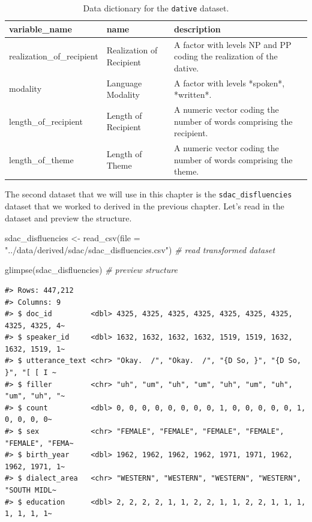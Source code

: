 \documentclass[
  letterpaper,
]{latex/krantz}
\newenvironment{Shaded}{\begin{snugshade}}{\end{snugshade}}
\newcommand{\AttributeTok}[1]{\textcolor[rgb]{0.00,0.00,0.00}{#1}}
\newcommand{\CommentTok}[1]{\textcolor[rgb]{0.00,0.00,0.00}{\textit{#1}}}
\newcommand{\FunctionTok}[1]{\textcolor[rgb]{0.00,0.00,0.00}{#1}}
\newcommand{\NormalTok}[1]{\textcolor[rgb]{0.00,0.00,0.00}{#1}}
\newcommand{\OtherTok}[1]{\textcolor[rgb]{0.00,0.00,0.00}{#1}}
\newcommand{\StringTok}[1]{\textcolor[rgb]{0.00,0.00,0.00}{#1}}
\begin{document}
\hypertarget{tbl-i-dative-dictionary}{}
\begin{table}
\caption{\label{tbl-i-dative-dictionary}Data dictionary for the \texttt{dative} dataset. }\tabularnewline

\centering
\begin{tabular}{lll}
\toprule
variable\_name & name & description\\
\midrule
realization\_of\_recipient & Realization of Recipient & A factor with levels NP and PP coding the realization of the dative.\\
modality & Language Modality & A factor with levels *spoken*, *written*.\\
length\_of\_recipient & Length of Recipient & A numeric vector coding the number of words comprising the recipient.\\
length\_of\_theme & Length of Theme & A numeric vector coding the number of words comprising the theme.\\
\bottomrule
\end{tabular}
\end{table}

The second dataset that we will use in this chapter is the
\texttt{sdac\_disfluencies} dataset that we worked to derived in the
previous chapter. Let's read in the dataset and preview the structure.

\begin{Shaded}
\begin{Highlighting}[]
\NormalTok{sdac\_disfluencies }\OtherTok{\textless{}{-}} 
  \FunctionTok{read\_csv}\NormalTok{(}\AttributeTok{file =} \StringTok{"../data/derived/sdac/sdac\_disfluencies.csv"}\NormalTok{) }\CommentTok{\# read transformed dataset}

\FunctionTok{glimpse}\NormalTok{(sdac\_disfluencies) }\CommentTok{\# preview structure}
\end{Highlighting}
\end{Shaded}

\begin{verbatim}
#> Rows: 447,212
#> Columns: 9
#> $ doc_id         <dbl> 4325, 4325, 4325, 4325, 4325, 4325, 4325, 4325, 4325, 4~
#> $ speaker_id     <dbl> 1632, 1632, 1632, 1632, 1519, 1519, 1632, 1632, 1519, 1~
#> $ utterance_text <chr> "Okay.  /", "Okay.  /", "{D So, }", "{D So, }", "[ [ I ~
#> $ filler         <chr> "uh", "um", "uh", "um", "uh", "um", "uh", "um", "uh", "~
#> $ count          <dbl> 0, 0, 0, 0, 0, 0, 0, 0, 1, 0, 0, 0, 0, 0, 1, 0, 0, 0, 0~
#> $ sex            <chr> "FEMALE", "FEMALE", "FEMALE", "FEMALE", "FEMALE", "FEMA~
#> $ birth_year     <dbl> 1962, 1962, 1962, 1962, 1971, 1971, 1962, 1962, 1971, 1~
#> $ dialect_area   <chr> "WESTERN", "WESTERN", "WESTERN", "WESTERN", "SOUTH MIDL~
#> $ education      <dbl> 2, 2, 2, 2, 1, 1, 2, 2, 1, 1, 2, 2, 1, 1, 1, 1, 1, 1, 1~
\end{verbatim}
\end{document}
